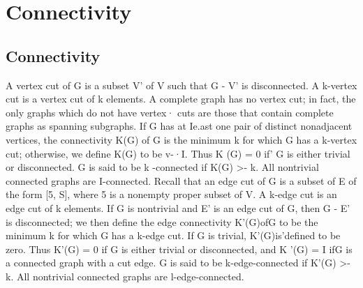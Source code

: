 \section{Connectivity}

\subsection{Connectivity}



A vertex cut of G is a subset V' of V such that G - V' is disconnected. A
k-vertex cut is a vertex cut of k elements. A complete graph has no vertex
cut; in fact, the only graphs which do not have vertex· cuts are those that
contain complete graphs as spanning subgraphs. If G has at Ie.ast one pair of
distinct nonadjacent vertices, the connectivity K(G) of G is the minimum k
for which G has a k-vertex cut; otherwise, we define K(G) to be v-·I. Thus
K (G) = 0 if' G is either trivial or disconnected. G is said to be k -connected if
K(G) >- k. All nontrivial connected graphs are I-connected.
Recall that an edge cut of G is a subset of E of the form [5, S], where 5 is
a nonempty proper subset of V. A k-edge cut is an edge cut of k elements.
If G is nontrivial and E' is an edge cut of G, then G - E' is disconnected; we
then define the edge connectivity K'(G)ofG to be the minimum k for which
G has a k-edge cut. If G is trivial, K'(G)is'defined to be zero. Thus K'(G) = 0
if G is either trivial or disconnected, and K '(G) = I ifG is a connected graph
with a cut edge. G is said to be k-edge-connected if K'(G) >- k. All nontrivial
connected graphs are l-edge-connected.